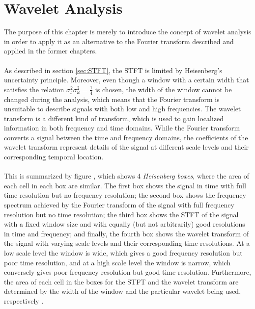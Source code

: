 \chapter{Wavelet Analysis} \label{ch12}
The purpose of this chapter is merely to introduce the concept of wavelet analysis in order to apply it as an alternative to the Fourier transform described and applied in the former chapters.
\\ \\
As described in section \ref{sec:STFT}, the STFT is limited by Heisenberg's uncertainty principle. Moreover, even though a window with a certain width that satisfies the relation $\sigma_t^2 \sigma_\omega^2 = \frac{1}{4}$ is chosen, the width of the window cannot be changed during the analysis, which means that the Fourier transform is unsuitable to describe signals with both low and high frequencies. The wavelet transform is a different kind of transform, which is used to gain localized information in both frequency and time domains. While the Fourier transform converts a signal between the time and frequency domains, the coefficients of the wavelet transform represent details of the signal at different scale levels and their corresponding temporal location.
\\ \\
This is summarized by figure , which shows 4 \textit{Heisenberg boxes}, where the area of each cell in each box are similar. The first box shows the signal in time with full time resolution but no frequency resolution; the second box shows the frequency spectrum achieved by the Fourier transform of the signal with full frequency resolution but no time resolution; the third box shows the STFT of the signal with a fixed window size and with equally (but not arbitrarily) good resolutions in time and frequency; and finally, the fourth box shows the wavelet transform of the signal with varying scale levels and their corresponding time resolutions. At a low scale level the window is wide, which gives a good frequency resolution but poor time resolution, and at a high scale level the window is narrow, which conversely gives poor frequency resolution but good time resolution. Furthermore, the area of each cell in the boxes for the STFT and the wavelet transform are determined by the width of the window and the particular wavelet being used, respectively \cite{pages 409-410, Wang} \cite{page 43-44, wave_tut}.

